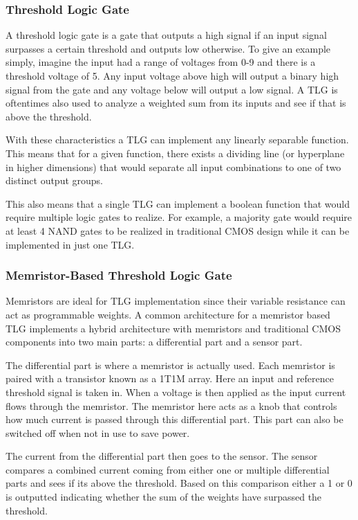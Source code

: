 \documentclass[sigconf,authordraft]{acmart}
\begin{document}
\subsubsection{Threshold Logic Gate}
A threshold logic gate is a gate that outputs a high signal if 
an input signal surpasses a certain threshold and outputs low 
otherwise. To give an example simply, imagine the input had a range 
of voltages from 0-9 and there is a threshold voltage of 5. Any
input voltage above high will output a binary high signal from the 
gate and any voltage below will output a low signal. A TLG 
is oftentimes also used to analyze a weighted sum from its inputs 
and see if that is above the threshold. 

With these characteristics a TLG can implement any linearly separable
function. This means that for a given function, there exists a 
dividing line (or hyperplane in higher dimensions) that would 
separate all input combinations to one of two distinct output 
groups. 

This also means that a single TLG can implement a boolean function 
that would require multiple logic gates to realize. For example, a 
majority gate would require at least 4 NAND gates to be realized in 
traditional CMOS design while it can be implemented in just one TLG. 

\subsubsection{Memristor-Based Threshold Logic Gate}
Memristors are ideal for TLG implementation since their variable 
resistance can act as programmable weights. A common architecture
for a memristor based TLG implements a hybrid architecture with 
memristors and traditional CMOS components into two main parts:
a differential part and a sensor part. 

The differential part is where a memristor is actually used. Each 
memristor is paired with a transistor known as a 1T1M array.
Here an input and reference threshold signal is taken in. When a 
voltage is then applied as the input current flows through the
memristor. The memristor here acts as a knob that controls how much 
current is passed through this differential part. This part 
can also be switched off when not in use to save power. 

The current from the differential part then goes to the sensor. 
The sensor compares a combined current coming from either one or 
multiple differential parts and sees if its above the threshold. 
Based on this comparison either a 1 or 0 is outputted indicating 
whether the sum of the weights have surpassed the threshold. 
\end{document}
